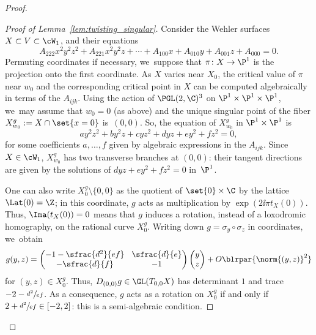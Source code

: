 \begin{proof}
\begin{proof}[Proof of Lemma~\ref{lem:twisting_singular}]
Consider the Wehler surfaces $X\subset V\subset \cW_1$, and their equations
\begin{equation*}
A_{222} x^2y^2z^2+ A_{221}x^2y^2z+\cdots + A_{100}x + A_{010}y+A_{001}z + A_{000} = 0.
\end{equation*}
Permuting coordinates if necessary, we~suppose that $\pi\colon X\to \P^1$ is the projection onto the first coordinate.
As $X$ varies near $X_0$, the critical value of $\pi$ near $w_0$ and the corresponding critical point in $X$ can be computed algebraically in terms of the $A_{ijk}$. Using the action of $\PGL(2, \C)^3$ on $\P^1\times \P^1\times \P^1$, we~may
assume that $w_0=0$ (as above) and the unique singular point of the fiber $X_{w_0}^g:=X \cap \set{x= 0}$ is~$(0,0)$.
So, the equation of $X_{w_0}^g$ in $\P^1\times \P^1$ is
\begin{equation*}
ay^2z^2 + b y^2z+cy z^2+ dyz+ey^2+f z^2 = 0,
\end{equation*}
for some coefficients $a, \ldots , f$ given by algebraic expressions in the $A_{ijk}$.
Since $X\in \cW_1$, $X_{w_0}^g$ has two transverse branches at $(0,0)$: their tangent directions are given
by the solutions of $dyz+ey^2+f z^2 = 0$ in~$\P^1$.

One can also write $X_0^g\setminus\{0,0\}$ as the quotient of $\set{0}\times \C$ by the lattice $\Lat(0)=\Z$; in this coordinate,
$g$ acts as multiplication by $\exp(2\ii \pi t_X(0))$. Thus, $\Ima(t_X(0)) = 0$ means that $g$ induces a rotation, instead of a loxodromic homography, on the rational curve $X_0^g$. Writing down $g = \sigma_y\circ \sigma_z$ in coordinates, we~obtain
\begin{equation*}\arraycolsep4.5pt
g(y,z) = \begin{pmatrix}-1 - \sfrac{d^2}{ef}& \sfrac{d}{e} \\ -\sfrac{d}{f} & -1
\end{pmatrix}\begin{pmatrix} y\\z\end{pmatrix} + O\blrpar{\norm{(y,z)}^2}
\end{equation*}
for $(y,z)\in X_0^g$.
Thus, $D_{(0, 0)}g\in \GL(T_{0,0}X)$ has determinant $1$ and trace $ - 2- \sfrac{d^2}{ef}$.
As a consequence, $g$ acts as a rotation on $X_0^g$ if and only if $ 2 + \sfrac{d^2}{ef} \in[-2, 2]$: this is a semi-algebraic condition.
\end{proof}


\end{proof}
